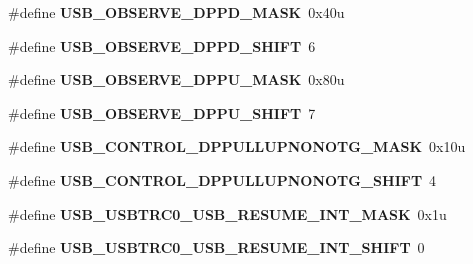 \begin{DoxyCompactItemize}
\mbox{\label{group___u_s_b___register___masks_ga8368ad607c0f5a0ab499734e26f36aad}} 
\#define {\bfseries U\+S\+B\+\_\+\+O\+B\+S\+E\+R\+V\+E\+\_\+\+D\+P\+P\+D\+\_\+\+M\+A\+SK}~0x40u
\item 
\mbox{\label{group___u_s_b___register___masks_gaba84f8caae5d942588bd678bbc2ad267}} 
\#define {\bfseries U\+S\+B\+\_\+\+O\+B\+S\+E\+R\+V\+E\+\_\+\+D\+P\+P\+D\+\_\+\+S\+H\+I\+FT}~6
\item 
\mbox{\label{group___u_s_b___register___masks_ga04f8b1d77478cb027a79323cef482965}} 
\#define {\bfseries U\+S\+B\+\_\+\+O\+B\+S\+E\+R\+V\+E\+\_\+\+D\+P\+P\+U\+\_\+\+M\+A\+SK}~0x80u
\item 
\mbox{\label{group___u_s_b___register___masks_ga08ff5b00473fda9eb458f3457490eb15}} 
\#define {\bfseries U\+S\+B\+\_\+\+O\+B\+S\+E\+R\+V\+E\+\_\+\+D\+P\+P\+U\+\_\+\+S\+H\+I\+FT}~7
\item 
\mbox{\label{group___u_s_b___register___masks_ga764d9d972859eeded5e092a77eb4de79}} 
\#define {\bfseries U\+S\+B\+\_\+\+C\+O\+N\+T\+R\+O\+L\+\_\+\+D\+P\+P\+U\+L\+L\+U\+P\+N\+O\+N\+O\+T\+G\+\_\+\+M\+A\+SK}~0x10u
\item 
\mbox{\label{group___u_s_b___register___masks_ga5bae9683a5ae7c48617b8d24a35786ce}} 
\#define {\bfseries U\+S\+B\+\_\+\+C\+O\+N\+T\+R\+O\+L\+\_\+\+D\+P\+P\+U\+L\+L\+U\+P\+N\+O\+N\+O\+T\+G\+\_\+\+S\+H\+I\+FT}~4
\item 
\mbox{\label{group___u_s_b___register___masks_ga9c943cc95fdf52fa40311292f2801518}} 
\#define {\bfseries U\+S\+B\+\_\+\+U\+S\+B\+T\+R\+C0\+\_\+\+U\+S\+B\+\_\+\+R\+E\+S\+U\+M\+E\+\_\+\+I\+N\+T\+\_\+\+M\+A\+SK}~0x1u
\item 
\mbox{\label{group___u_s_b___register___masks_ga48af1176ed5d811c299eb123f934425d}} 
\#define {\bfseries U\+S\+B\+\_\+\+U\+S\+B\+T\+R\+C0\+\_\+\+U\+S\+B\+\_\+\+R\+E\+S\+U\+M\+E\+\_\+\+I\+N\+T\+\_\+\+S\+H\+I\+FT}~0
\item 
\mbox{\label{group___u_s_b___register___masks_ga2e2f3b4bb79885ed92d75c9f86d42e23}} 

\end{DoxyCompactItemize}
